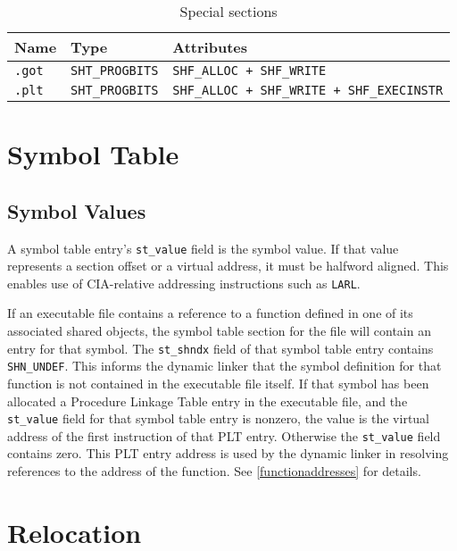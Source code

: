 \documentclass[english,11pt,twoside,toc=bib,toc=idx]{scrreprt}
\newenvironment{DIFnomarkup}{}{} %
\begin{document}
\begin{table}
  \centering
  \begin{DIFnomarkup}
  \begin{tabular}{lll}
    \toprule
    Name & Type & Attributes \\
    \midrule
    \texttt{.got} & \texttt{SHT\_PROGBITS} &
    \texttt{SHF\_ALLOC + SHF\_WRITE} \\
    \texttt{.plt} & \texttt{SHT\_PROGBITS} &
    \texttt{SHF\_ALLOC + SHF\_WRITE + SHF\_EXECINSTR} \\
    \bottomrule
  \end{tabular}
  \end{DIFnomarkup}
  \caption{Special sections}
  \label{tab:sections}
\end{table}

\section{Symbol Table}
\subsection{Symbol Values}
\label{symbolvalues}
A symbol table entry's \texttt{st\_value} field is the symbol value.  If
that value represents a section offset or a virtual address, it must be
halfword aligned.  This enables use of CIA-relative addressing
instructions such as \texttt{LARL}.

If an executable file contains a reference to a function defined in
one of its associated shared objects, the symbol table section for the
file will contain an entry for that symbol.  The \texttt{st\_shndx}
field of that symbol table entry contains \texttt{SHN\_UNDEF}.  This
informs the dynamic linker that the symbol definition for that
function is not contained in the executable file itself.  If that
symbol has been allocated a Procedure Linkage Table entry in the
executable file, and the \texttt{st\_value} field for that symbol
table entry is nonzero, the value is the virtual address of the first
instruction of that PLT entry.  Otherwise the \texttt{st\_value} field
contains zero.  This PLT entry address is used by the dynamic linker
in resolving references to the address of the function.  See
\cref{functionaddresses} for details.

\section{Relocation}
\end{document}
